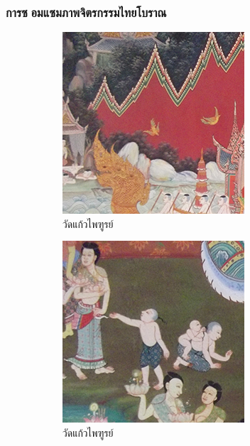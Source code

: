 \documentclass[xcolor=dvipsnames, xetex,serif]{beamer}
\numberwithin{equation}{section}
\begin{document}
		\begin{frame}
			\frametitle{การซอมแซมภาพจิตรกรรมไทยโบราณ}
			\begin{figure}[H]
				\centering
				\begin{subfigure}{0.3\linewidth}
					\centering
					\includegraphics[width=0.7\linewidth]{images/thaiart/case01-original.png}
					\caption{วัดแก้วไพฑูรย์}
					\label{image:thaiart_case01_original}
				\end{subfigure}
				\begin{subfigure}{0.3\linewidth}
					\centering
					\includegraphics[width=0.7\linewidth]{images/thaiart/case02-original.png}
					\caption{วัดแก้วไพฑูรย์}
					\label{image:thaiart_case02_original}
				\end{subfigure}
				\begin{subfigure}{0.3\linewidth}

\end{subfigure}
\end{figure}
\end{frame}
\end{document}
